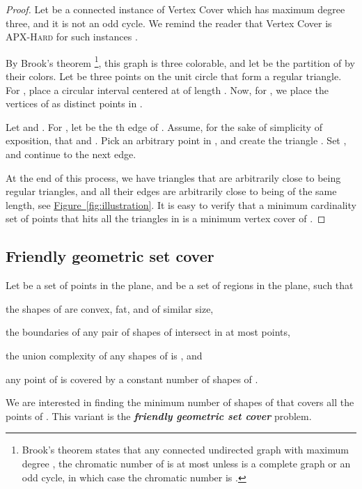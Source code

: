 \documentclass[12pt]{article}
\newcommand{\emphic}[2]{\textcolor{blue25}{\textbf{\emph{#1}}}\index{#2}}
\renewcommand{\emphic}[2]{\textbf{\emph{#1}}}
\newcommand{\emphi}[1]{\emphic{#1}{#1}}
\theoremstyle{remark}\theoremheaderfont{\sf}\theorembodyfont{\upshape}
\numberwithin{figure}{section}\numberwithin{table}{section}\numberwithin{equation}{section}
\newcommand{\HLink}[2]{\hyperref[#2]{#1~\ref*{#2}}}
\newcommand{\figref}[1]{\HLink{Figure}{fig:#1}}
\renewcommand{\th}{th\xspace}
\newcommand{\ProblemC}[1]{\textsf{#1}}
\providecommand{\ComplexityClass}[1]{{{\textcolor[named]{ColorComplexityClass}{\textsc{#1}}}}}
\newcommand{\APXHard}{\ComplexityClass{APX-Hard}\xspace}
\begin{document}
\begin{proof}
  Let  be a connected instance of
  \ProblemC{Vertex Cover} which has maximum degree three, and it is
  not an odd cycle. We remind the reader that \ProblemC{Vertex Cover}
  is \APXHard for such instances \cite{acgkm-ca-99}.

  By Brook's theorem \cite{cr-btb-15}\footnote{Brook's theorem states
    that any connected undirected graph  with maximum degree
    , the chromatic number of  is at most 
    unless  is a complete graph or an odd cycle, in which case
    the chromatic number is .}, this graph is three
  colorable, and let  be the
  partition of  by their colors. Let
   be three points on the unit circle that
  form a regular triangle. For , place a circular interval
   centered at  of length . Now, for
  , we place the vertices of  as distinct points
  in .

  Let  and .
  For , let  be the \th edge of
  . Assume, for the sake of simplicity of exposition, that
   and .  Pick an arbitrary
  point  in , and
  create the triangle . Set
  , and continue to
  the next edge.

  At the end of this process, we have  triangles
   that are arbitrarily close to
  being regular triangles, and all their edges are arbitrarily close
  to being of the same length, see \figref{illustration}. It is easy
  to verify that a minimum cardinality set of points
   that hits all the triangles in  is
  a minimum vertex cover of .
\end{proof}


\subsection{Friendly geometric set cover}

Let  be a set of  points in the plane, and  be a
set of  regions in the plane, such that
\begin{compactenum}[\qquad(I)]
\item the shapes of  are convex, fat, and of similar size,
\item the boundaries of any pair of shapes of  intersect in
  at most  points,
\item the union complexity of any  shapes of  is ,
  and
\item any point of  is covered by a constant number of shapes
  of .  \end{compactenum}\smallskip We are interested in finding the minimum number of shapes of 
that covers all the points of .  This variant is the
\emphi{friendly geometric set cover} problem.
\end{document}
